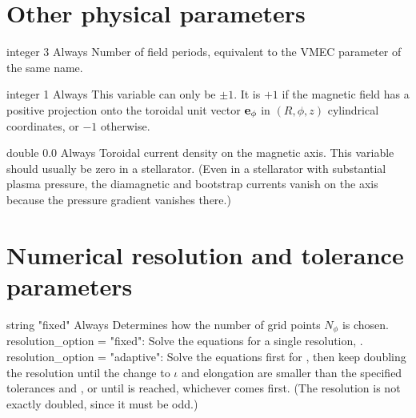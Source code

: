 \myhrule



\section{Other physical parameters}

{integer}
{3}
{Always}
{Number of field periods, equivalent to the VMEC parameter of the same name.}

\myhrule

{integer}
{1}
{Always}
{This variable can only be $\pm 1$. It is $+1$ if the magnetic field has a positive projection onto the toroidal unit vector ${\mathbf e}_\phi$
in $(R,\phi,z)$ cylindrical coordinates, or $-1$ otherwise.}

\myhrule

{double}
{0.0}
{Always}
{Toroidal current density on the magnetic axis. This variable should usually be zero in a stellarator.  (Even in a stellarator with substantial plasma pressure, the diamagnetic and bootstrap currents vanish on the axis because the pressure gradient vanishes there.)}

\myhrule


\section{Numerical resolution and tolerance parameters}

{string}
{{\ttfamily "fixed"}}
{Always}
{Determines how the number of grid points $N_{\phi}$ is chosen.\\

{\ttfamily resolution\_option} = {\ttfamily "fixed"}: Solve the equations for a single resolution, .\\

{\ttfamily resolution\_option} = {\ttfamily "adaptive"}: Solve the equations first for , then keep doubling the resolution until the change to $\iota$ and elongation are smaller than the specified tolerances  and , or until  is reached, whichever comes first. (The resolution is not exactly doubled, since it must be odd.)\\

}

